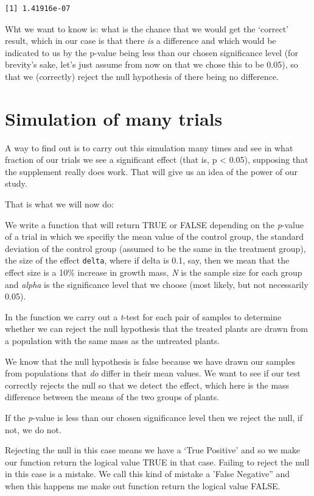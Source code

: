 \documentclass[
  letterpaper,
  DIV=11,
  numbers=noendperiod]{scrreprt}
\begin{document}
\begin{verbatim}
[1] 1.41916e-07
\end{verbatim}

Wht we want to know is: what is the chance that we would get the
`correct' result, which in our case is that there \emph{is} a difference
and which would be indicated to us by the p-value being less than our
chosen significance level (for brevity's sake, let's just assume from
now on that we chose this to be 0.05), so that we (correctly) reject the
null hypothesis of there being no difference.

\section{Simulation of many trials}\label{simulation-of-many-trials}

A way to find out is to carry out this simulation many times and see in
what fraction of our trials we see a significant effect (that is, p
\textless{} 0.05), supposing that the supplement really does work. That
will give us an idea of the power of our study.

That is what we will now do:

We write a function that will return TRUE or FALSE depending on the
\emph{p}-value of a trial in which we specifiy the mean value of the
control group, the standard deviation of the control group (assumed to
be the same in the treatment group), the size of the effect
\texttt{delta}, where if delta is 0.1, say, then we mean that the effect
size is a 10\% increase in growth mass, \emph{N} is the sample size for
each group and \emph{alpha} is the significance level that we choose
(most likely, but not necessarily 0.05).

In the function we carry out a \emph{t}-test for each pair of samples to
determine whether we can reject the null hypothesis that the treated
plants are drawn from a population with the same mass as the untreated
plants.

We know that the null hypothesis is false because we have drawn our
samples from populations that \emph{do} differ in their mean values. We
want to see if our test correctly rejects the null so that we detect the
effect, which here is the mass difference between the means of the two
groups of plants.

If the \emph{p}-value is less than our chosen significance level then we
reject the null, if not, we do not.

Rejecting the null in this case means we have a `True Positive' and so
we make our function return the logical value TRUE in that case. Failing
to reject the null in this case is a mistake. We call this kind of
mistake a 'False Negative'' and when this happens me make out function
return the logical value FALSE.
\end{document}
